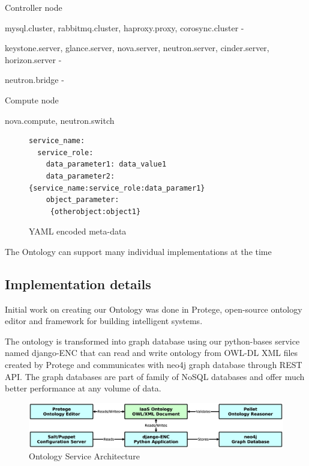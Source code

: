 Controller node

mysql.cluster, rabbitmq.cluster, haproxy.proxy, corosync.cluster -

keystone.server, glance.server, nova.server, neutron.server, cinder.server, horizon.server - 

neutron.bridge -

Compute node

nova.compute, neutron.switch

\begin{figure}[!h]
\centering
\begin{lstlisting}
service_name:
  service_role:
    data_parameter1: data_value1
    data_parameter2: {service_name:service_role:data_paramer1}
    object_parameter:
     {otherobject:object1}
\end{lstlisting}
\caption{YAML encoded meta-data}
\label{fig:cm}
\end{figure}



The Ontology can support many individual implementations at the time

% 

\subsection{Implementation details}


Initial work on creating our Ontology was done in Protege, open-source ontology editor and framework for building intelligent systems.

The ontology is transformed into graph database using our python-bases service named django-ENC that can read and write ontology from OWL-DL XML files created by Protege and communicates with neo4j graph database through REST API. The graph databases are part of family of NoSQL databases and offer much better performance at any volume of data.

\begin{figure}[!h]
\centering
\includegraphics[scale=.17]{img/django_enc_arch.eps}
\caption{Ontology Service Architecture}
\label{fig:cm}
\end{figure}

